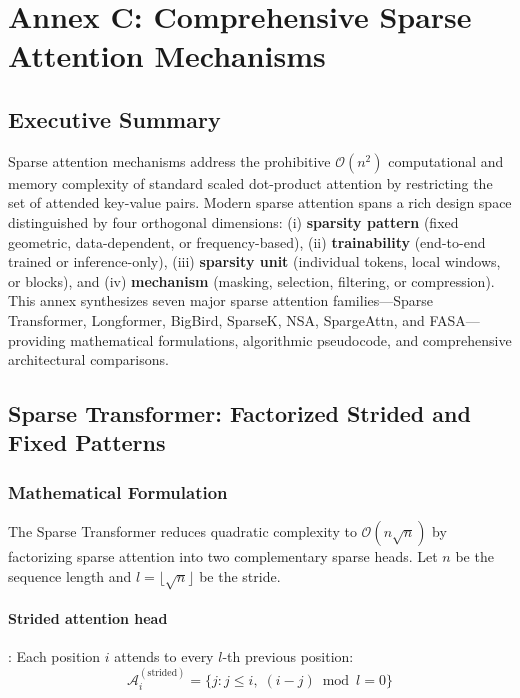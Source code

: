 \section{Annex C: Comprehensive Sparse Attention Mechanisms}
\label{sec:annex-sparse}

\subsection{Executive Summary}

Sparse attention mechanisms address the prohibitive $\mathcal{O}(n^2)$ computational and memory complexity of standard scaled dot-product attention by restricting the set of attended key-value pairs. Modern sparse attention spans a rich design space distinguished by four orthogonal dimensions: (i) \textbf{sparsity pattern} (fixed geometric, data-dependent, or frequency-based), (ii) \textbf{trainability} (end-to-end trained or inference-only), (iii) \textbf{sparsity unit} (individual tokens, local windows, or blocks), and (iv) \textbf{mechanism} (masking, selection, filtering, or compression). This annex synthesizes seven major sparse attention families---Sparse Transformer, Longformer, BigBird, SparseK, NSA, SpargeAttn, and FASA---providing mathematical formulations, algorithmic pseudocode, and comprehensive architectural comparisons.

\subsection{Sparse Transformer: Factorized Strided and Fixed Patterns}

\subsubsection{Mathematical Formulation}

The Sparse Transformer \citep{child_sparse_transformer_2019} reduces quadratic complexity to $\mathcal{O}(n\sqrt{n})$ by factorizing sparse attention into two complementary sparse heads. Let $n$ be the sequence length and $l = \lfloor\sqrt{n}\rfloor$ be the stride.

\paragraph{Strided attention head}: Each position $i$ attends to every $l$-th previous position:
\[
\mathcal{A}_i^{(\text{strided})} = \{j : j \leq i,\; (i - j) \bmod l = 0\}
\]

